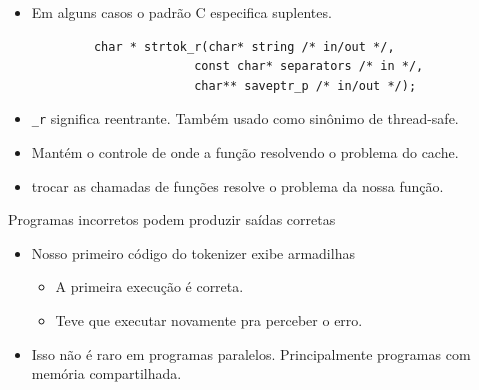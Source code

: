 	\begin{frame}[fragile]
		\begin{itemize}
			\item Em alguns casos o  padrão C especifica suplentes.	
		\end{itemize}

		\begin{verbatim}
			char * strtok_r(char* string /* in/out */, 
						  const char* separators /* in */, 
						  char** saveptr_p /* in/out */);
		\end{verbatim}

		\begin{itemize}
			\item {\tt \_r} significa reentrante. Também usado como sinônimo de thread-safe.
			\item Mantém o controle de onde a função resolvendo o problema do cache.
			\item trocar as chamadas de funções resolve o problema da nossa função.
		\end{itemize}
\end{frame}

	\begin{frame}{Programas incorretos podem produzir saídas corretas}
		\begin{itemize}
			\item Nosso primeiro código do tokenizer exibe armadilhas
			\begin{itemize}
				\item A primeira execução é correta.
				\item Teve que executar novamente pra perceber o erro.
			\end{itemize}
			\item Isso não é raro em programas paralelos. Principalmente programas com memória compartilhada.
		\end{itemize}
\end{frame}